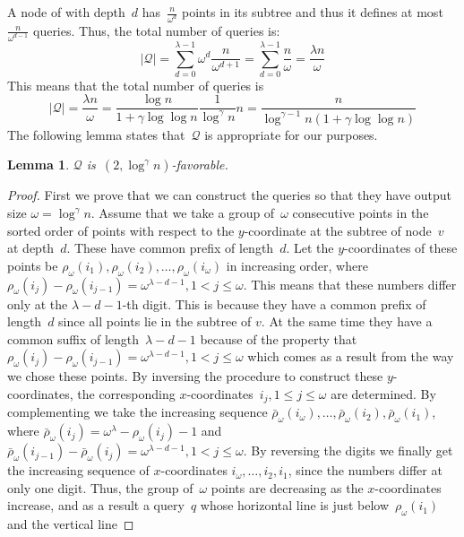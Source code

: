 \documentclass[]{article}
\newtheorem{lemma}{Lemma}[section]
\begin{document}
A node of with depth~$d$ has~$\frac{n}{\omega^d}$ points in its subtree and thus
it defines at most~$\frac{n}{\omega^{d-1}}$ queries. Thus, the total number of
queries is:
\[
  \left|\mathcal{Q}\right| = \sum_{d=0}^{\lambda-1}{\omega^d
  \frac{n}{\omega^{d+1}}} = \sum_{d=0}^{\lambda-1}{\frac{n}{\omega}} =
  \frac{\lambda n}{\omega}
\]
This means that the total number of queries is
\[
  |\mathcal{Q}|=\frac{\lambda n}{\omega}
  =
  \frac{\log{n}}{1+\gamma\log{\log{n}}}\frac{1}{\log^\gamma{n}}n
  =
  \frac{n}{\log^{\gamma-1}{n}(1+\gamma\log{\log{n}})}
\] 
The following lemma states that~$\mathcal{Q}$ is appropriate for our purposes.
\begin{lemma} \label{lem:query}
  $\mathcal{Q}$ is~$(2,\log^\gamma{n})$-favorable. 
\end{lemma}
\begin{proof}
  First we prove that we can construct the queries so that they have output size
  $\omega = \log^\gamma{n}$. Assume that we take a group of~$\omega$ consecutive
  points in the sorted order of points with respect to the $y$-coordinate at the
  subtree of node~$v$ at depth~$d$. These have common prefix of length~$d$. Let
  the $y$-coordinates of these points be
  $\rho_{\omega}(i_1),\rho_{\omega}(i_2),\ldots,\rho_{\omega}(i_{\omega})$ in
  increasing order, where $\rho_{\omega}(i_j) -\rho_{\omega}(i_{j-1})
  =\omega^{\lambda-d-1}, 1 < j \leq \omega$. This means that these numbers
  differ only at the $\lambda - d -1$-th digit. This is because they have a
  common prefix of length~$d$ since all points lie in the subtree of $v$. At the
  same time they have a common suffix of length~$\lambda -d -1$ because of the
  property that $\rho_{\omega}(i_j) -\rho_{\omega}(i_{j-1})
  =\omega^{\lambda-d-1}, 1 < j \leq \omega$ which comes as a result from the way
  we chose these points. By inversing the procedure to construct these
  $y$-coordinates, the corresponding $x$-coordinates~$i_j, 1 \leq j \leq \omega$
  are determined. By complementing we take the increasing sequence
  $\bar{\rho}_{\omega}(i_{\omega}),\ldots,\bar{\rho}_{\omega}(i_2),\bar{\rho}_{\omega}(i_1)$,
  where $\bar{\rho}_{\omega}(i_j)=\omega^\lambda-\rho_{\omega}(i_j)-1 $ and
  $\bar{\rho}_{\omega}(i_{j-1}) -\bar{\rho}_{\omega}(i_{j})
  =\omega^{\lambda-d-1}, 1 < j \leq \omega$. By reversing the digits we finally
  get the increasing sequence of $x$-coordinates $i_{\omega},\ldots,i_2,i_1$,
  since the numbers differ at only one digit. Thus, the group of~$\omega$ points
  are decreasing as the $x$-coordinates increase, and as a result a query~$q$
  whose horizontal line is just below~$\rho_{\omega}(i_1)$ and the vertical line

\end{proof}
\end{document}
